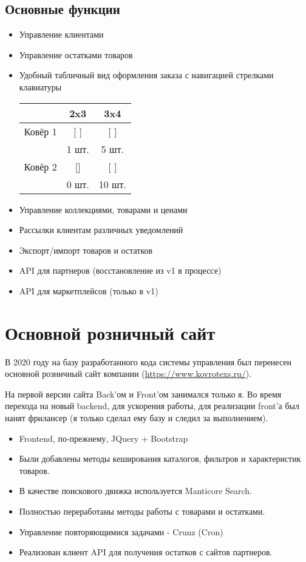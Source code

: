 \documentclass[10pt]{tpl/developercv} %
\begin{document}
\subsection{Основные функции}
\begin{itemize}
  \item Управление клиентами
  \item Управление остатками товаров
  \item {
    Удобный табличный вид оформления заказа с навигацией стрелками клавиатуры
    \begin{center}
      \begin{tabular}{ |c|c|c| }
        \hline
        & 2x3 & 3x4 \\
        \hline
         Ковёр 1 & [  ] & [  ] \\
                & 1 шт. & 5 шт. \\
        \hline
         Ковёр 2 & [] & [  ] \\
                & 0 шт. & 10 шт. \\
        \hline
      \end{tabular}
    \end{center}
  }
  \item Управление коллекциями, товарами и ценами
  \item Рассылки клиентам различных уведомлений
  \item Экспорт/импорт товаров и остатков
  \item API для партнеров (восстановление из v1 в процессе)
  \item API для маркетплейсов (только в v1)
\end{itemize}

\section{Основной розничный сайт}
В 2020 году на базу разработанного кода системы управления был перенесен основной розничный сайт компании (\href{https://www.kovrotexs.ru/}{https://www.kovrotexs.ru/}).

На первой версии сайта Back'ом и Front'ом занимался только я. Во время перехода на новый backend, для ускорения работы, для реализации front'а был нанят фрилансер (я только сделал ему базу и следил за выполнением).

\begin{itemize}
  \item Frontend, по-прежнему, JQuery + Bootstrap
  \item Были добавлены методы кеширования каталогов, фильтров и характеристик товаров.
  \item В качестве поискового движка используется Manticore Search.
  \item Полностью переработаны методы работы с товарами и остатками.
  \item Управление повторяющимися задачами - Crunz (Cron)
  \item Реализован клиент API для получения остатков с сайтов партнеров.
\end{itemize}
\end{document}
